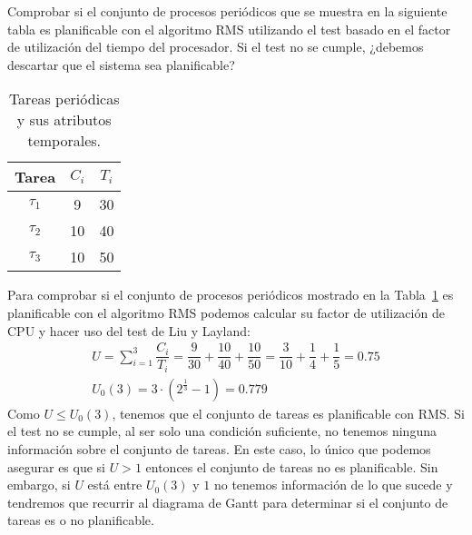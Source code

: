 \begin{ejercicio}\label{ej:rel4_3}
    Comprobar si el conjunto de procesos periódicos que se muestra en la siguiente tabla es planificable con el algoritmo RMS utilizando el test basado en el factor de utilización del tiempo del procesador. Si el test no se cumple, ¿debemos descartar que el sistema sea planificable?    
    \begin{table}[H]
    \centering
    \begin{tabular}{|c|c|c|}
        \hline
        Tarea & $C_i$ & $T_i$ \\
        \hline
        $\tau_1$ & 9 & 30 \\
        \hline
        $\tau_2$ & 10 & 40 \\
        \hline
        $\tau_3$ & 10 & 50 \\
        \hline
    \end{tabular}
    \caption{Tareas periódicas y sus atributos temporales.}
    \label{tab:4_3}
    \end{table}

    Para comprobar si el conjunto de procesos periódicos mostrado en la Tabla~\ref{tab:4_3} es planificable con el algoritmo RMS podemos calcular su factor de utilización de CPU y hacer uso del test de Liu y Layland:
    \begin{gather*}
        U = \sum_{i=1}^{3}\dfrac{C_i}{T_i} = \dfrac{9}{30} + \dfrac{10}{40} + \dfrac{10}{50} = \dfrac{3}{10} + \dfrac{1}{4} + \dfrac{1}{5} = 0.75 \\
        U_0(3) = 3\cdot \left(2^{\frac{1}{3}}-1\right) = 0.779
    \end{gather*}
    Como $U \leq U_0(3)$, tenemos que el conjunto de tareas es planificable con RMS\@. Si el test no se cumple, al ser solo una condición suficiente, no tenemos ninguna información sobre el conjunto de tareas. En este caso, lo único que podemos asegurar es que si $U>1$ entonces el conjunto de tareas no es planificable. Sin embargo, si $U$ está entre $U_0(3)$ y $1$ no tenemos información de lo que sucede y tendremos que recurrir al diagrama de Gantt para determinar si el conjunto de tareas es o no planificable.
\end{ejercicio}

